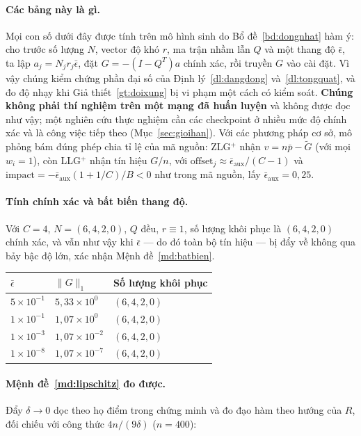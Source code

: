 \documentclass[11pt]{article}
\theoremstyle{remark}
\begin{document}
\paragraph{Các bảng này là gì.}
Mọi con số dưới đây được tính trên mô hình sinh do Bổ đề~\ref{bd:dongnhat}
hàm ý: cho trước số lượng $N$, vector độ khó $r$, ma trận nhầm lẫn $Q$ và một
thang độ $\bar\epsilon$, ta lập $a_j = N_jr_j\bar\epsilon$, đặt
$G = -(I-Q^T)a$ chính xác, rồi truyền $G$ vào cài đặt. Vì vậy chúng kiểm
chứng phần đại số của Định lý~\ref{dl:dangdong} và~\ref{dl:tongquat}, và đo
độ nhạy khi Giả thiết~\ref{gt:doixung} bị vi phạm một cách có kiểm soát.
\textbf{Chúng không phải thí nghiệm trên một mạng đã huấn luyện} và không
được đọc như vậy; một nghiên cứu thực nghiệm cần các checkpoint ở nhiều mức
độ chính xác và là công việc tiếp theo (Mục~\ref{sec:gioihan}). Với các
phương pháp cơ sở, mô phỏng bám đúng phép chia tỉ lệ của mã nguồn: ZLG$^+$
nhận $v = n\bar p - \tilde G$ (với mọi $w_i = 1$), còn LLG$^+$ nhận tín hiệu
$G/n$, với $\mathrm{offset}_j \approx \bar\epsilon_{\mathrm{aux}}/(C-1)$ và
$\mathrm{impact} = -\bar\epsilon_{\mathrm{aux}}(1+1/C)/B < 0$ như trong mã
nguồn, lấy $\bar\epsilon_{\mathrm{aux}} = 0{,}25$.

\paragraph{Tính chính xác và bất biến thang độ.}
Với $C=4$, $N=(6,4,2,0)$, $Q$ đều, $r\equiv1$, số lượng khôi phục là
$(6,4,2,0)$ chính xác, và vẫn như vậy khi $\bar\epsilon$ --- do đó toàn bộ
tín hiệu --- bị đẩy về không qua bảy bậc độ lớn, xác nhận
Mệnh đề~\ref{md:batbien}.

\begin{center}
\footnotesize
\begin{tabular}{@{}lll@{}}
\toprule
$\bar\epsilon$ & $\|G\|_1$ & Số lượng khôi phục \\
\midrule
$5\times10^{-1}$ & $5{,}33\times10^{0}$  & $(6,4,2,0)$ \\
$1\times10^{-1}$ & $1{,}07\times10^{0}$  & $(6,4,2,0)$ \\
$1\times10^{-3}$ & $1{,}07\times10^{-2}$ & $(6,4,2,0)$ \\
$1\times10^{-8}$ & $1{,}07\times10^{-7}$ & $(6,4,2,0)$ \\
\bottomrule
\end{tabular}
\end{center}

\paragraph{Mệnh đề~\ref{md:lipschitz} đo được.}
Đẩy $\delta \to 0$ dọc theo họ điểm trong chứng minh và đo đạo hàm theo hướng
của $R$, đối chiếu với công thức $4n/(9\delta)$ ($n = 400$):
\end{document}
